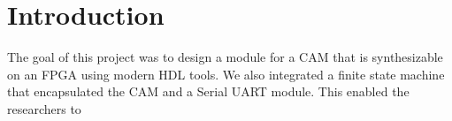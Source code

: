 \section{Introduction}
The goal of this project was to design a module for a CAM that is synthesizable on an FPGA using modern HDL tools. 
We also integrated a finite state machine that encapsulated the CAM and a Serial UART module. This enabled the researchers to 